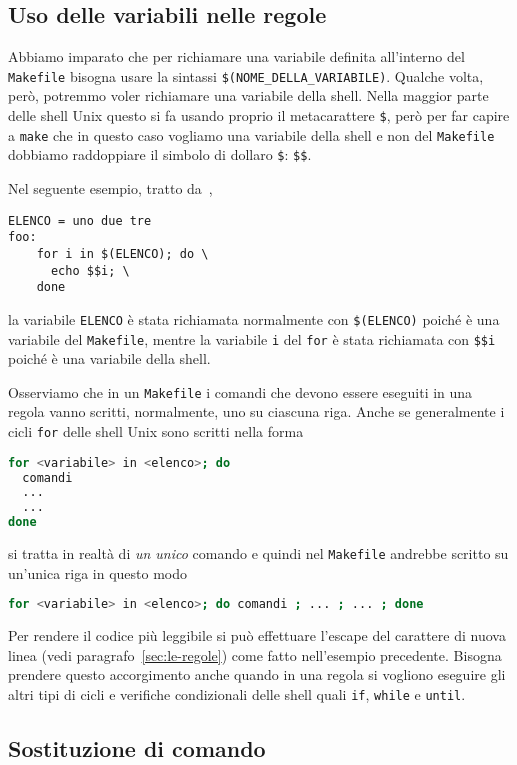 \subsection{Uso delle variabili nelle regole}
\label{sec:uso-variabili}

Abbiamo imparato che per richiamare una variabile definita all'interno del
\verb|Makefile| bisogna usare la sintassi
\verb|$(NOME_DELLA_VARIABILE)|.  Qualche volta, però, potremmo voler richiamare
una variabile della shell.  Nella maggior parte delle shell Unix questo si fa
usando proprio il metacarattere \verb|$|,
però per far capire a \verb|make| che in questo caso vogliamo una variabile
della shell e non del \verb|Makefile| dobbiamo raddoppiare il simbolo di dollaro
\verb|$|: \verb|$$|.

Nel seguente esempio, tratto da~\textcite[43]{gnu:make},
\begin{lstlisting}
ELENCO = uno due tre
foo:
	for i in $(ELENCO); do \
	  echo $$i; \
	done
\end{lstlisting}
la variabile \verb|ELENCO| è stata richiamata normalmente con
\verb|$(ELENCO)| poiché è una variabile del \verb|Makefile|, mentre la variabile
\verb|i| del \verb|for| è stata richiamata con \verb|$$i|
poiché è una variabile della shell.

Osserviamo che in un \verb|Makefile| i comandi che devono essere eseguiti in una
regola vanno scritti, normalmente, uno su ciascuna riga.  Anche se generalmente
i cicli \verb|for| delle shell Unix sono scritti nella forma
\begin{lstlisting}[language=bash]
for <variabile> in <elenco>; do
  comandi
  ...
  ...
done
\end{lstlisting}
si tratta in realtà di \emph{un unico} comando e quindi nel \verb|Makefile|
andrebbe scritto su un'unica riga in questo modo
\begin{lstlisting}[language=bash]
for <variabile> in <elenco>; do comandi ; ... ; ... ; done
\end{lstlisting}
Per rendere il codice più leggibile si può effettuare l'escape del carattere di
nuova linea (vedi paragrafo~\ref{sec:le-regole}) come fatto nell'esempio
precedente.  Bisogna prendere questo accorgimento anche quando in una regola si
vogliono eseguire gli altri tipi di cicli e verifiche condizionali delle shell
quali \verb|if|, \verb|while| e \verb|until|.

\subsection{Sostituzione di comando}
\label{sec:sostituzione-comando}


